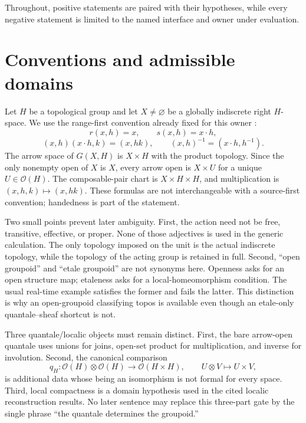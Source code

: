 \documentclass[12pt]{article}
\theoremstyle{definition}
\newcommand{\Ocal}{\mathcal O}
\begin{document}
Throughout, positive statements are paired with their hypotheses, while every negative statement is limited to the named interface and owner under evaluation.

\section{Conventions and admissible domains}

Let $H$ be a topological group and let $X\ne\varnothing$ be a globally indiscrete right $H$-space.  We use the range-first convention already fixed for this owner \cite[lines~255--277]{wang2026convolution}:
\begin{equation}\label{eq:ops}
 r(x,h)=x,\qquad s(x,h)=x\cdot h,
\end{equation}
\begin{equation}\label{eq:prod}
 (x,h)(x\cdot h,k)=(x,hk),\qquad
 (x,h)^{-1}=(x\cdot h,h^{-1}).
\end{equation}
The arrow space of $G(X,H)$ is $X\times H$ with the product topology.  Since the only nonempty open of $X$ is $X$, every arrow open is $X\times U$ for a unique $U\in\Ocal(H)$.  The composable-pair chart is $X\times H\times H$, and multiplication is $(x,h,k)\mapsto(x,hk)$.  These formulas are not interchangeable with a source-first convention; handedness is part of the statement.

Two small points prevent later ambiguity.  First, the action need not be free, transitive, effective, or proper.  None of those adjectives is used in the generic calculation.  The only topology imposed on the unit is the actual indiscrete topology, while the topology of the acting group is retained in full.  Second, ``open groupoid'' and ``etale groupoid'' are not synonyms here.  Openness asks for an open structure map; etaleness asks for a local-homeomorphism condition.  The usual real-time example satisfies the former and fails the latter.  This distinction is why an open-groupoid classifying topos is available even though an etale-only quantale--sheaf shortcut is not.

Three quantale/localic objects must remain distinct.  First, the bare arrow-open quantale uses unions for joins, open-set product for multiplication, and inverse for involution.  Second, the canonical comparison
\[
 q_H:\Ocal(H)\otimes\Ocal(H)\longrightarrow\Ocal(H\times H),
 \qquad U\otimes V\longmapsto U\times V,
\]
is additional data whose being an isomorphism is not formal for every space.  Third, local compactness is a domain hypothesis used in the cited localic reconstruction results.  No later sentence may replace this three-part gate by the single phrase ``the quantale determines the groupoid.''
\end{document}
